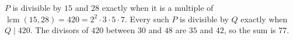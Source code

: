 $P$ is divisible by $15$ and $28$ exactly when it is a multiple of $\operatorname{lcm}(15,28)=420=2^2\cdot3\cdot5\cdot7$. Every such $P$ is divisible by $Q$ exactly when $Q\mid420$. The divisors of $420$ between $30$ and $48$ are $35$ and $42$, so the sum is $\boxed{77}$.
